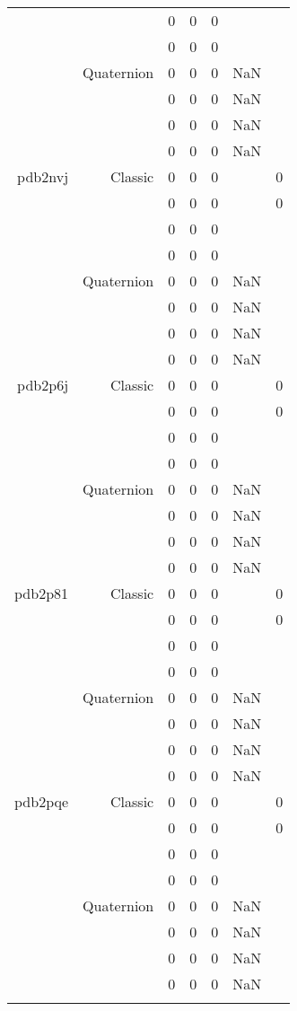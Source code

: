 \begin{xltabular}{\textwidth}{r|rcccSc}
& & 0 & 0 & 0 & & \\
& & 0 & 0 & 0 & & \\
& Quaternion & 0 & 0 & 0 & NaN & \\
& & 0 & 0 & 0 & NaN & \\
& & 0 & 0 & 0 & NaN & \\
& & 0 & 0 & 0 & NaN & \\ \addlinespace
pdb2nvj & Classic & 0 & 0 & 0 & & 0 \\
& & 0 & 0 & 0 & & 0 \\
& & 0 & 0 & 0 & & \\
& & 0 & 0 & 0 & & \\
& Quaternion & 0 & 0 & 0 & NaN & \\
& & 0 & 0 & 0 & NaN & \\
& & 0 & 0 & 0 & NaN & \\
& & 0 & 0 & 0 & NaN & \\ \addlinespace
pdb2p6j & Classic & 0 & 0 & 0 & & 0 \\
& & 0 & 0 & 0 & & 0 \\
& & 0 & 0 & 0 & & \\
& & 0 & 0 & 0 & & \\
& Quaternion & 0 & 0 & 0 & NaN & \\
& & 0 & 0 & 0 & NaN & \\
& & 0 & 0 & 0 & NaN & \\
& & 0 & 0 & 0 & NaN & \\ \addlinespace
pdb2p81 & Classic & 0 & 0 & 0 & & 0 \\
& & 0 & 0 & 0 & & 0 \\
& & 0 & 0 & 0 & & \\
& & 0 & 0 & 0 & & \\
& Quaternion & 0 & 0 & 0 & NaN & \\
& & 0 & 0 & 0 & NaN & \\
& & 0 & 0 & 0 & NaN & \\
& & 0 & 0 & 0 & NaN & \\ \addlinespace
pdb2pqe & Classic & 0 & 0 & 0 & & 0 \\
& & 0 & 0 & 0 & & 0 \\
& & 0 & 0 & 0 & & \\
& & 0 & 0 & 0 & & \\
& Quaternion & 0 & 0 & 0 & NaN & \\
& & 0 & 0 & 0 & NaN & \\
& & 0 & 0 & 0 & NaN & \\
& & 0 & 0 & 0 & NaN & \\ \addlinespace

\end{xltabular}
